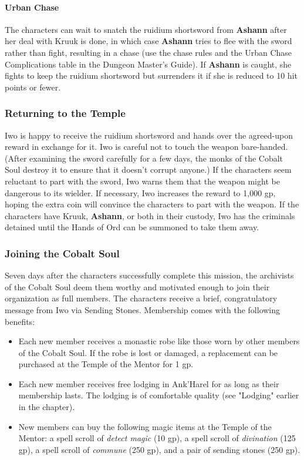 \documentclass[10pt,a4,twoside,twocolumn,openany,nodeprecatedcode]{dndbook}
\begin{document}
\paragraph{Urban Chase}
The characters can wait to snatch the ruidium shortsword from \textbf{Ashann} after her deal with Kruuk is done, in which case \textbf{Ashann} tries to flee with the sword rather than fight, resulting in a chase (use the chase rules and the Urban Chase Complications table in the Dungeon Master's Guide). If \textbf{Ashann} is caught, she fights to keep the ruidium shortsword but surrenders it if she is reduced to 10 hit points or fewer.
\subsubsection{Returning to the Temple}
Iwo is happy to receive the ruidium shortsword and hands over the agreed-upon reward in exchange for it. Iwo is careful not to touch the weapon bare-handed. (After examining the sword carefully for a few days, the monks of the Cobalt Soul destroy it to ensure that it doesn't corrupt anyone.) If the characters seem reluctant to part with the sword, Iwo warns them that the weapon might be dangerous to its wielder. If necessary, Iwo increases the reward to 1,000 gp, hoping the extra coin will convince the characters to part with the weapon.
If the characters have Kruuk, \textbf{Ashann}, or both in their custody, Iwo has the criminals detained until the Hands of Ord can be summoned to take them away.
\subsubsection{Joining the Cobalt Soul}
Seven days after the characters successfully complete this mission, the archivists of the Cobalt Soul deem them worthy and motivated enough to join their organization as full members. The characters receive a brief, congratulatory message from Iwo via Sending Stones. Membership comes with the following benefits:
\begin{itemize}

\item Each new member receives a monastic robe like those worn by other members of the Cobalt Soul. If the robe is lost or damaged, a replacement can be purchased at the Temple of the Mentor for 1 gp.
\item Each new member receives free lodging in Ank'Harel for as long as their membership lasts. The lodging is of comfortable quality (see "Lodging" earlier in the chapter).
\item New members can buy the following magic items at the Temple of the Mentor: a spell scroll of \textit{detect magic} (10 gp), a spell scroll of \textit{divination} (125 gp), a spell scroll of \textit{commune} (250 gp), and a pair of sending stones (250 gp).
\end{itemize}
\end{document}

